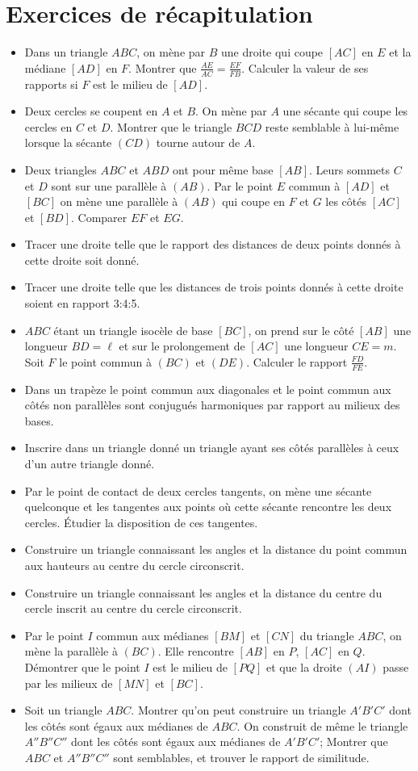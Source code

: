 \documentclass[12 pt]{report}
\theoremstyle{plain}
\newcounter{n}
\renewcommand{\it}{\item[$\mathbf{\then}.$]\stepcounter{n} }
\begin{document}
\chapter*{Exercices de récapitulation}
\begin{itemize}
\it Dans un triangle $ABC$, on mène par $B$ une droite qui coupe $[AC]$ en $E$ et la médiane $[AD]$ en $F$. Montrer que $\frac{AE}{AC} = \frac{EF}{FB}$. Calculer la valeur de ses rapports si $F$ est le milieu de $[AD]$. 
\it Deux cercles se coupent en $A$ et $B$. On mène par $A$ une sécante qui coupe les cercles en $C$ et $D$. Montrer que le triangle $BCD$ reste semblable à lui-même lorsque la sécante $(CD)$ tourne autour de $A$. 
\it Deux triangles $ABC$ et $ABD$ ont pour même base $[AB]$. Leurs sommets $C$ et $D$ sont sur une parallèle à $(AB)$. Par le point $E$ commun à $[AD]$ et $[BC]$ on mène une parallèle à $(AB)$ qui coupe en $F$ et $G$ les côtés $[AC]$ et $[BD]$. Comparer $EF$ et $EG$. 
\it Tracer une droite telle que le rapport des distances de deux points donnés à cette droite soit donné. 
\it Tracer une droite telle que les distances de trois points donnés à cette droite soient en rapport 3:4:5. 
\it $ABC$ étant un triangle isocèle de base $[BC]$, on prend sur le côté $[AB]$ une longueur $BD=\ell$ et sur le prolongement de $[AC]$ une longueur $CE = m$. Soit $F$ le point commun à $(BC)$ et $(DE)$. Calculer le rapport $\frac{FD}{FE}$. 
\it Dans un trapèze le point commun aux diagonales et le point commun aux côtés non parallèles sont conjugués harmoniques par rapport au milieux des bases.
\it Inscrire dans un triangle donné un triangle ayant ses côtés parallèles à ceux d'un autre triangle donné. 
\it Par le point de contact de deux cercles tangents, on mène une sécante quelconque et les tangentes aux points où cette sécante rencontre les deux cercles. Étudier la disposition de ces tangentes.
\it Construire un triangle connaissant les angles et la distance du point commun aux hauteurs au centre du cercle circonscrit. 
\it Construire un triangle connaissant les angles et la distance du centre du cercle inscrit au centre du cercle circonscrit. 
\it Par le point $I$ commun aux médianes $[BM]$ et $[CN]$ du triangle $ABC$, on mène la parallèle à $(BC)$. Elle rencontre $[AB]$ en $P$, $[AC]$ en $Q$. Démontrer que le point $I$ est le milieu de $[PQ]$ et que la droite $(AI)$ passe par les milieux de $[MN]$ et $[BC]$. 
\it Soit un triangle $ABC$. Montrer qu'on peut construire un triangle $A'B'C'$ dont les côtés sont égaux aux médianes de $ABC$. On construit de même le triangle $A''B''C''$ dont les côtés sont égaux aux médianes de $A'B'C'$; Montrer que $ABC$ et $A''B''C''$ sont semblables, et trouver le rapport de similitude. 

\end{itemize}
\end{document}
